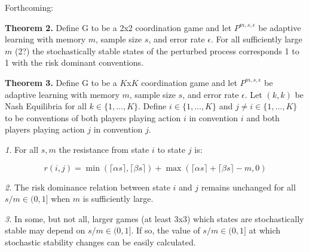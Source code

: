 \documentclass{article}
\begin{document}
\centering
\Large

\pagebreak

Forthcoming:

\textbf{Theorem 2.} Define G to be a 2x2 coordination game and let $P^{m,s,\epsilon}$ be adaptive learning with memory $m$, sample size $s$, and error rate $\epsilon$. For all sufficiently large $m$ (2?) the stochastically stable states of the perturbed process corresponds 1 to 1 with the risk dominant conventions.

\vskip12pt

\textbf{Theorem 3.} Define G to be a $K$x$K$ coordination game and let $P^{m,s,\epsilon}$ be adaptive learning with memory $m$, sample size $s$, and error rate $\epsilon$. Let $(k,k)$ be Nash Equilibria for all $k \in \{1,...,K\}$. Define $i \in \{1,...,K\}$ and $j \neq i \in \{1,...,K\}$ to be conventions of both players playing action $i$ in convention $i$ and both players playing action $j$ in convention $j$.

\textit{1.} For all $s, m$ the resistance from state $i$ to state $j$ is:

$$r(i,j)=\min(\lceil \alpha s \rceil,\lceil \beta s \rceil)+\max(\lceil \alpha s \rceil+\lceil \beta s \rceil-m,0)$$

\textit{2.} The risk dominance relation between state $i$ and $j$ remains unchanged for all $s/m \in (0,1]$ when $m$ is sufficiently large.

\textit{3.} In some, but not all, larger games (at least 3x3) which states are stochastically stable may depend on $s/m \in (0,1]$. If so, the value of $s/m \in (0,1]$ at which stochastic stability changes can be easily calculated.

\end{document}
